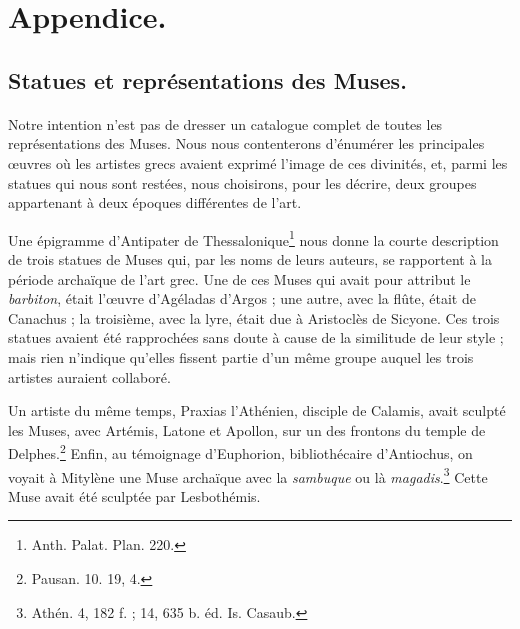 \documentclass[a4paper, 11pt, oneside, polutonikogreek, french]{article}
\begin{document}
\section{Appendice.}
\subsection{Statues et représentations des Muses.}
\paragraph{}
Notre intention n'est pas de dresser un catalogue complet de toutes les représentations des Muses. Nous nous contenterons d'énumérer les principales œuvres où les artistes grecs avaient exprimé l'image de ces divinités, et, parmi les statues qui nous sont restées, nous choisirons, pour les décrire, deux groupes appartenant à deux époques différentes de l'art.

Une épigramme d'Antipater de Thessalonique\footnote{Anth. Palat. Plan. 220.} nous donne la courte description de trois statues de Muses qui, par les noms de leurs auteurs, se rapportent à la période archaïque de l'art grec. Une de ces Muses qui avait pour attribut le \emph{barbiton}, était l'œuvre d'Agéladas d'Argos ; une autre, avec la flûte, était de Canachus ; la troisième, avec la lyre, était due à Aristoclès de Sicyone. Ces trois statues avaient été rapprochées sans doute à cause de la similitude de leur style ; mais rien n'indique qu'elles fissent partie d'un même groupe auquel les trois artistes auraient collaboré.

Un artiste du même temps, Praxias l'Athénien, disciple de Calamis, avait sculpté les Muses, avec Artémis, Latone et Apollon, sur un des frontons du temple de Delphes.\footnote{Pausan. 10. 19, 4.} Enfin, au témoignage d'Euphorion, bibliothécaire d'Antiochus, on voyait à Mitylène une Muse archaïque avec la \emph{sambuque} ou là \emph{magadis}.\footnote{Athén. 4, 182 f. ; 14, 635 b. éd. Is. Casaub.} Cette Muse avait été sculptée par Lesbothémis.
\end{document}

